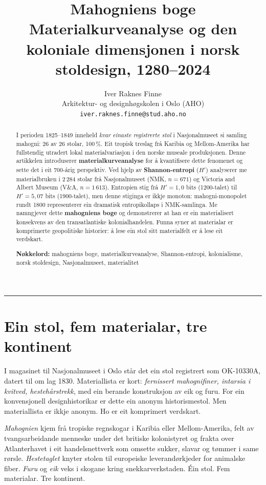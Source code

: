 \documentclass[10pt, a4paper, twocolumn]{article}
\title{%
  \textbf{Mahogniens boge}\\[0.4em]
  \large Materialkurveanalyse og den koloniale dimensjonen i norsk stoldesign, 1280--2024%
}
\author{%
  Iver Raknes Finne\\
  \small Arkitektur- og designhøgskolen i Oslo (AHO)\\
  \small \texttt{iver.raknes.finne@stud.aho.no}
}
\date{}
\begin{document}
\maketitle

\begin{abstract}
\noindent I perioden 1825--1849 inneheld \emph{kvar einaste registrerte stol} i Nasjonalmuseet si samling mahogni: 26 av 26 stolar, 100\,\%. Eit tropisk treslag frå Karibia og Mellom-Amerika har fullstendig utradert lokal materialvariasjon i den norske museale produksjonen. Denne artikkelen introduserer \textbf{materialkurveanalyse} for å kvantifisere dette fenomenet og sette det i eit 700-årig perspektiv. Ved hjelp av \textbf{Shannon-entropi} ($H'$) analyserer me materialbruken i 2\,284 stolar frå Nasjonalmuseet (NMK, $n = 671$) og Victoria and Albert Museum (V\&A, $n = 1\,613$). Entropien stig frå $H' = 1{,}0$ bits (1200-talet) til $H' = 5{,}07$ bits (1900-talet), men denne stiginga er ikkje monoton: mahogni-monopolet rundt 1800 representerer ein dramatisk entropikollaps i NMK-samlinga. Me namngjever dette \textbf{mahogniens boge} og demonstrerer at han er ein materialisert konsekvens av den transatlantiske kolonialhandelen. Funna syner at materialar er komprimerte geopolitiske historier: å lese ein stol sitt materialfelt er å lese eit verdskart.

\medskip
\noindent\textbf{Nøkkelord:} mahogniens boge, materialkurveanalyse, Shannon-entropi, kolonialisme, norsk stoldesign, Nasjonalmuseet, materialitet
\end{abstract}

\vspace{1em}
\hrule
\vspace{1.5em}


\section{Ein stol, fem materialar, tre kontinent}

I magasinet til Nasjonalmuseet i Oslo står det ein stol registrert som OK-10330A, datert til om lag 1830. Materiallista er kort: \emph{fernissert mahognifiner, intarsia i kvitved, hestehårstrekk}, med ein berande konstruksjon av eik og furu. For ein konvensjonell designhistorikar er dette ein anonym historismestol. Men materiallista er ikkje anonym. Ho er eit komprimert verdskart.

\emph{Mahognien} kjem frå tropiske regnskogar i Karibia eller Mellom-Amerika, felt av tvangsarbeidande menneske under det britiske kolonistyret og frakta over Atlanterhavet i eit handelsnettverk som omsette sukker, slavar og tømmer i same rørsle. \emph{Hestetaglet} knyter stolen til europeiske leverandørkjeder for animalske fiber. \emph{Furu} og \emph{eik} veks i skogane kring snekkarverkstaden. Éin stol. Fem materialar. Tre kontinent.
\end{document}
